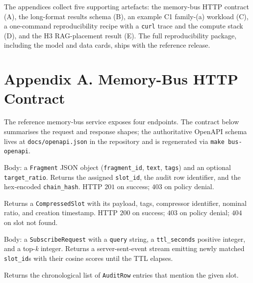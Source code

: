 
\noindent The appendices collect five supporting artefacts: the
memory-bus HTTP contract (A), the long-format results schema (B), an
example C1 family-(a) workload (C), a one-command reproducibility
recipe with a \texttt{curl} trace and the compute stack (D), and the
H3 RAG-placement result (E). The full reproducibility package,
including the model and data cards, ships with the reference release.

\section{Appendix A. Memory-Bus HTTP Contract}

The reference memory-bus service exposes four endpoints. The contract
below summarises the request and response shapes; the authoritative
OpenAPI schema lives at \texttt{docs/openapi.json} in the repository
and is regenerated via \texttt{make bus-openapi}.

\begin{description}\setlength\itemsep{0pt}
\item[\texttt{POST /v1/write}] Body: a \texttt{Fragment} JSON object
(\texttt{fragment\_id}, \texttt{text}, \texttt{tags}) and an optional
\texttt{target\_ratio}. Returns the assigned \texttt{slot\_id}, the
audit row identifier, and the hex-encoded \texttt{chain\_hash}.
HTTP $201$ on success; $403$ on policy denial.

\item[\texttt{GET /v1/read/\{slot\_id\}}] Returns a
\texttt{CompressedSlot} with its payload, tags, compressor identifier,
nominal ratio, and creation timestamp. HTTP $200$ on success;
$403$ on policy denial; $404$ on slot not found.

\item[\texttt{POST /v1/subscribe}] Body: a \texttt{SubscribeRequest}
with a \texttt{query} string, a \texttt{ttl\_seconds} positive integer,
and a top-\textit{k} integer. Returns a server-sent-event stream
emitting newly matched \texttt{slot\_id}s with their cosine scores
until the TTL elapses.

\item[\texttt{GET /v1/audit/\{slot\_id\}}] Returns the chronological
list of \texttt{AuditRow} entries that mention the given slot.
\end{description}

